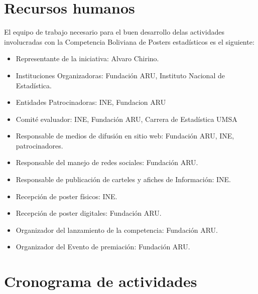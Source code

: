 \documentclass{article}
\begin{document}
\section{Recursos humanos}

El equipo de trabajo necesario para el buen desarrollo delas actividades involucradas con la Competencia Boliviana de Posters estadísticos es el siguiente: \\

\begin{itemize}
\item Representante de la iniciativa: Alvaro Chirino.  
\item Instituciones Organizadoras: Fundación ARU, Instituto Nacional de Estadística.
\item Entidades Patrocinadoras: INE, Fundacion ARU
\item Comité evaluador: INE, Fundación ARU, Carrera de Estadística UMSA
\item Responsable de medios de difusión en sitio web:  Fundación ARU, INE, patrocinadores. 
\item Responsable del manejo de redes sociales: Fundación ARU.
\item Responsable de publicación de carteles y afiches de Información: INE.
\item Recepción de poster físicos: INE.
\item Recepción de poster digitales: Fundación ARU.
\item Organizador del lanzamiento de la competencia: Fundación ARU.
\item Organizador del Evento de premiación: Fundación ARU.

\end{itemize}


\section{Cronograma de actividades}
\end{document}
